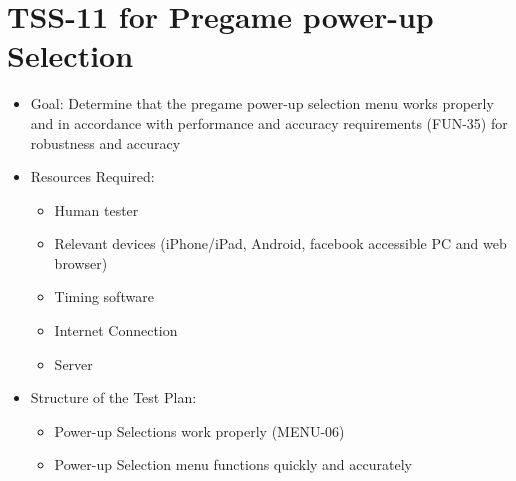 \section{TSS-11 for Pregame power-up Selection}
\begin{itemize}
\item Goal: Determine that the pregame power-up selection menu works properly and in accordance with performance and accuracy requirements (FUN-35) for robustness and accuracy

\item Resources Required:
\begin{itemize}
\item Human tester
\item Relevant devices (iPhone/iPad, Android, facebook accessible PC and web browser)
\item Timing software
\item Internet Connection 
\item Server
\end{itemize}

\item Structure of the Test Plan: 
\begin{itemize}
\item Power-up Selections work properly (MENU-06)
\item Power-up Selection menu functions quickly and accurately
\end{itemize}
\end{itemize}

